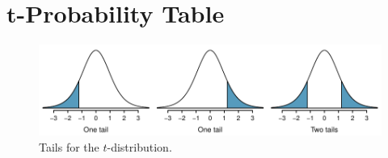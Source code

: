 \section{$\mathbf{t}$-Probability Table}
\label{tDistributionTable}

\begin{figure}[h]
\centering
\includegraphics[width=\textwidth]{extraTeX/appendix/figures/tTails/tTails}
\caption{Tails for the $t$-distribution.}
\label{tTails}
\end{figure}

